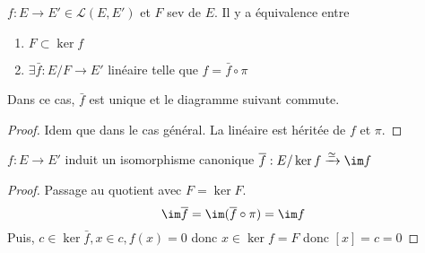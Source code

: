 \begin{thm}
    $f:E \longrightarrow E' \in  \mathcal  L(E, E')$ et $F$ sev de $E$. Il y a équivalence entre \begin{enumerate}
        \item $F\subset \ker f$
        \item  $ \exists \bar f: E / F \longrightarrow E'$ linéaire telle que $f=\bar f\circ \pi$
    \end{enumerate}
    Dans ce cas, $\bar f$ est unique et le diagramme suivant commute.
\begin{center}
\end{center}
\end{thm}

\begin{proof}
Idem que dans le cas général. La linéaire est héritée de $f$ et  $\pi$.
\end{proof}

\begin{thm}
    $f:E \longrightarrow E'$ induit un isomorphisme canonique  $\bar f: E / \ker f \xrightarrow{\simeq} \im f$
\end{thm}

\begin{proof}
Passage au quotient avec $F=\ker F$.  \[
    \im \bar f=\im(\bar f\circ \pi)=\im f
\]
Puis, $c \in  \ker \bar f, x \in  c, f(x)=0$ donc $x \in  \ker f=F$ donc $[x]=c=0$
\end{proof}

